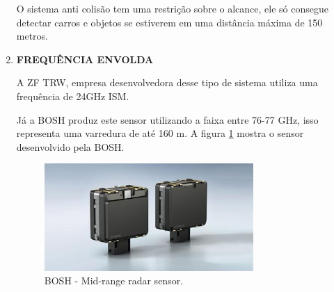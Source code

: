 \begin{enumerate}
O sistema anti colisão tem uma restrição sobre o alcance, ele só consegue detectar
carros e objetos se estiverem em uma distância máxima de 150 metros. \cite{9comper}


\item \textbf{FREQUÊNCIA ENVOLDA}

A ZF TRW, empresa desenvolvedora desse tipo de sistema utiliza uma frequência de
24GHz ISM.

Já a BOSH produz este sensor utilizando a faixa entre 76-77 GHz,
isso representa uma varredura de até 160 m. A figura \ref{fig:bosh} mostra o
sensor desenvolvido pela BOSH.

\begin{figure}[h]
  \centering
  \includegraphics[width=300px, scale=1]{figuras/bosh}
  \caption{BOSH - Mid-range radar sensor.}
\label{fig:bosh}
\end{figure}
\end{enumerate}
